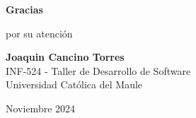 \documentclass[aspectratio=169]{beamer}
\begin{document}
\begin{frame}[plain]
\begin{center}
\vspace{2cm}
{\Huge \textcolor{goldprimary}{\textbf{Gracias}}}

\vspace{0.5cm}

{\Large por su atención}

\vspace{2cm}

{\large \textcolor{darktext}{
\textbf{Joaquin Cancino Torres} \\
INF-524 - Taller de Desarrollo de Software \\
Universidad Católica del Maule
}}

\vspace{1cm}

{\normalsize \textcolor{goldsecondary}{Noviembre 2024}}
\end{center}
\end{frame}
\end{document}
